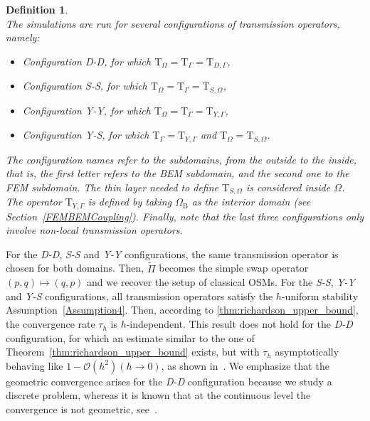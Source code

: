 \documentclass[a4paper,11pt]{article}
\newcommand{\mT}{\mathrm{T}}
\newcommand{\DespresDespres}{\textit{D-D}}
\newcommand{\SchurSchur}{\textit{S-S}}
\newcommand{\SchurYukawa}{\textit{Y-S}}
\newcommand{\YukawaYukawa}{\textit{Y-Y}}
\newtheorem{defn}{Definition}[section]
\begin{document}

\begin{defn}\label{dfn:transmission_choices}\quad\\
  The simulations are run for several configurations of transmission operators, namely:
  \begin{itemize}
    \item Configuration \DespresDespres, for which \(\mT_{\Omega} = \mT_{\Gamma} = \mT_{D,\Gamma}\),
    \item Configuration \SchurSchur, for which \(\mT_{\Omega} = \mT_{\Gamma} = \mT_{S,\Omega}\),
    \item Configuration \YukawaYukawa, for which \(\mT_{\Omega} = \mT_{\Gamma} = \mT_{Y,\Gamma}\),
    \item Configuration \SchurYukawa, for which \(\mT_{\Gamma} = \mT_{Y,\Gamma}\) and \(\mT_{\Omega} = \mT_{S,\Omega}\).
  \end{itemize}
  The configuration names refer to the subdomains, from the outside to the inside, that is, the first letter refers to the BEM subdomain, and the second one to the FEM subdomain.
  The thin layer needed to define \(\mT_{S,\Omega}\) is considered inside \(\Omega\). The operator \(\mT_{Y,\Gamma}\) is defined by taking \(\Omega_{\text{B}}\) as the \emph{interior} domain (see Section~\ref{FEMBEMCoupling}).
  Finally, note that the last three configurations only involve \emph{non-local} transmission operators.
\end{defn}

For the \DespresDespres, \SchurSchur{} and \YukawaYukawa{} configurations,
the same transmission operator is chosen for both domains.
Then, \(\tilde{\Pi}\) becomes the simple swap operator
$(p,q)\mapsto (q,p)$ and we recover the setup of classical OSMs.
For the \SchurSchur, \YukawaYukawa{} and \SchurYukawa{} configurations, all transmission operators satisfy the \(h\)-uniform stability Assumption~\eqref{Assumption4}. Then, according to \cref{thm:richardson_upper_bound}, the convergence rate \(\tau_h\) is \(h\)-independent.
This result does not hold for the \DespresDespres{} configuration, for which an estimate similar to the one of Theorem~\ref{thm:richardson_upper_bound} exists, but with \(\tau_h\) asymptotically behaving like \(1-\mathcal{O}(h^2)(h \to 0)\), as shown in~\cite[Remark~12.3]{MR4433119}. We emphasize that the geometric convergence arises for the \DespresDespres{} configuration because we study a discrete problem, whereas it is known that at the continuous level the convergence is not geometric, see~\cite{CollinoGhanemiEtAl2000DDM}.
\end{document}
